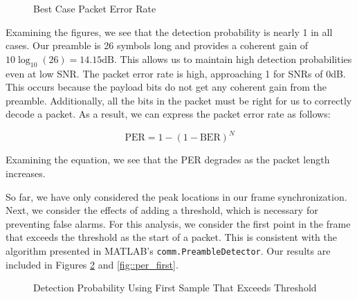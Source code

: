\documentclass{article}
\begin{document}
\begin{figure}[H]
	\centerline{}
	\caption{Best Case Packet Error Rate}
	\label{fig::per_peak}
\end{figure}

\noindent Examining the figures, we see that the detection probability is nearly 1 in all cases. Our preamble is 26 symbols long and provides a coherent gain of $10\log_{10}(26) = 14.15 \text{dB}$. This allows us to maintain high detection probabilities even at low SNR. The packet error rate is high, approaching 1 for SNRs of 0dB. This occurs because the payload bits do not get any coherent gain from the preamble. Additionally, all the bits in the packet must be right for us to correctly decode a packet. As a result, we can express the packet error rate as follows:

\begin{equation*}
	\text{PER} = 1 - (1 - \text{BER})^N
\end{equation*}

\noindent Examining the equation, we see that the PER degrades as the packet length increases.

So far, we have only considered the peak locations in our frame synchronization. Next, we consider the effects of adding a threshold, which is necessary for preventing false alarms. For this analysis, we consider the first point in the frame that exceeds the threshold as the start of a packet. This is consistent with the algorithm presented in MATLAB's \texttt{comm.PreambleDetector}. Our results are included in Figures \ref{fig::detection_probability_first} and \ref{fig::per_first}.

\begin{figure}[H]
	\centerline{}
	\caption{Detection Probability Using First Sample That Exceeds Threshold}
	\label{fig::detection_probability_first}
\end{figure}
\end{document}
